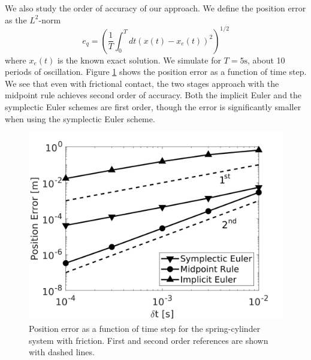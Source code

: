 We also study the order of accuracy of our approach. We define the position error as the $L^2$-norm
\begin{equation*}
    e_q = \left(\frac{1}{T}\int_0^T dt(x(t)-x_e(t))^2\right)^{1/2}
\end{equation*}
where $x_e(t)$ is the known exact solution. We simulate for $T=5\text{
s}$, about 10 periods of oscillation. Figure \ref{fig:spring_cylinder_position_error} shows the position error as
a function of time step. We see that even with frictional contact, the two
stages approach with the midpoint rule achieves second order of accuracy. Both the implicit Euler and the symplectic Euler schemes are first order,
though the error is significantly smaller when using the symplectic Euler
scheme.
\begin{figure}[!h]
	\centering
	\includegraphics[width=0.7\columnwidth]{figures/spring_cylinder/position_error.png}
	\caption{\label{fig:spring_cylinder_position_error} 
	Position error as a function of time step for the spring-cylinder system
	with friction. First and second order references are shown with dashed
	lines.}
\end{figure}